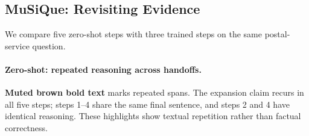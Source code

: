 \subsection{MuSiQue: Revisiting Evidence}
\label{app:case_musique}

We compare five zero-shot steps with three trained steps on the same postal-service question.

\begingroup
\setlength{\fboxsep}{7pt}
\endgroup

\paragraph{Zero-shot: repeated reasoning across handoffs.}
\textcolor{caseTranscriptEmphasis}{\textbf{Muted brown bold text}} marks repeated spans. The expansion claim recurs in all five steps; steps 1--4 share the same final sentence, and steps 2 and 4 have identical reasoning. These highlights show textual repetition rather than factual correctness.

